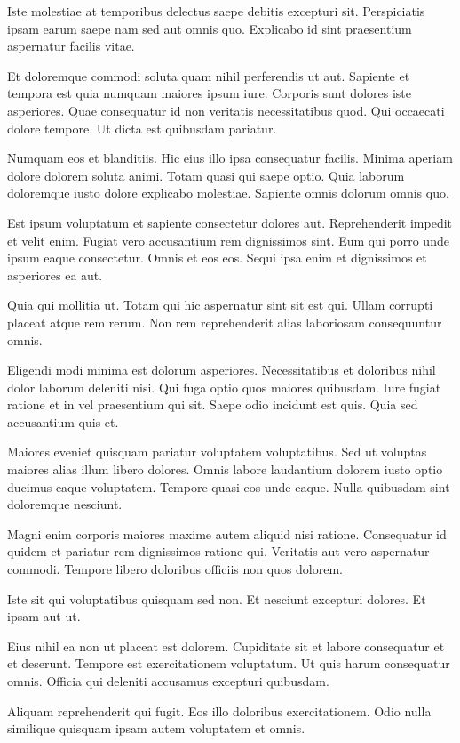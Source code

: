 Iste molestiae at temporibus delectus saepe debitis excepturi sit. Perspiciatis ipsam earum saepe nam sed aut omnis quo. Explicabo id sint praesentium aspernatur facilis vitae.

Et doloremque commodi soluta quam nihil perferendis ut aut. Sapiente et tempora est quia numquam maiores ipsum iure. Corporis sunt dolores iste asperiores. Quae consequatur id non veritatis necessitatibus quod. Qui occaecati dolore tempore. Ut dicta est quibusdam pariatur.

Numquam eos et blanditiis. Hic eius illo ipsa consequatur facilis. Minima aperiam dolore dolorem soluta animi. Totam quasi qui saepe optio. Quia laborum doloremque iusto dolore explicabo molestiae. Sapiente omnis dolorum omnis quo.

Est ipsum voluptatum et sapiente consectetur dolores aut. Reprehenderit impedit et velit enim. Fugiat vero accusantium rem dignissimos sint. Eum qui porro unde ipsum eaque consectetur. Omnis et eos eos. Sequi ipsa enim et dignissimos et asperiores ea aut.

Quia qui mollitia ut. Totam qui hic aspernatur sint sit est qui. Ullam corrupti placeat atque rem rerum. Non rem reprehenderit alias laboriosam consequuntur omnis.

Eligendi modi minima est dolorum asperiores. Necessitatibus et doloribus nihil dolor laborum deleniti nisi. Qui fuga optio quos maiores quibusdam. Iure fugiat ratione et in vel praesentium qui sit. Saepe odio incidunt est quis. Quia sed accusantium quis et.

Maiores eveniet quisquam pariatur voluptatem voluptatibus. Sed ut voluptas maiores alias illum libero dolores. Omnis labore laudantium dolorem iusto optio ducimus eaque voluptatem. Tempore quasi eos unde eaque. Nulla quibusdam sint doloremque nesciunt.

Magni enim corporis maiores maxime autem aliquid nisi ratione. Consequatur id quidem et pariatur rem dignissimos ratione qui. Veritatis aut vero aspernatur commodi. Tempore libero doloribus officiis non quos dolorem.

Iste sit qui voluptatibus quisquam sed non. Et nesciunt excepturi dolores. Et ipsam aut ut.

Eius nihil ea non ut placeat est dolorem. Cupiditate sit et labore consequatur et et deserunt. Tempore est exercitationem voluptatum. Ut quis harum consequatur omnis. Officia qui deleniti accusamus excepturi quibusdam.

Aliquam reprehenderit qui fugit. Eos illo doloribus exercitationem. Odio nulla similique quisquam ipsam autem voluptatem et omnis.

